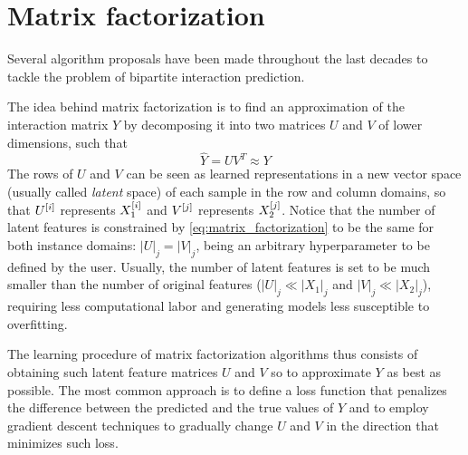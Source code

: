 \section{Matrix factorization}
\label{sec:matrix_factorization}

Several algorithm proposals have been made throughout the last decades to tackle the problem of bipartite interaction prediction. 


The idea behind matrix factorization is to find an approximation of the interaction matrix $Y$ by decomposing it into two matrices $U$ and $V$ of lower dimensions, such that %
%
\begin{equation}
    \hat Y = U V^T \approx Y
    \label{eq:matrix_factorization}
\end{equation}
%
The rows of $U$ and $V$ can be seen as learned representations in a new vector space (usually called \emph{latent} space) of each sample in the row and column domains, so that $U^{[i]}$ represents $X_1^{[i]}$ and $V^{[j]}$ represents $X_2^{[j]}$.
%
Notice that the number of latent features is constrained by \autoref{eq:matrix_factorization} to be the same for both instance domains: $|U|_j=|V|_j$, being an arbitrary hyperparameter to be defined by the user. Usually, the number of latent features is set to be much smaller than the number of original features ($|U|_j \ll |X_1|_j$ and $|V|_j \ll |X_2|_j$), requiring less computational labor and generating models less susceptible to overfitting.

The learning procedure of matrix factorization algorithms thus consists of obtaining such latent feature matrices $U$ and $V$ so to approximate $Y$ as best as possible. The most common approach is to define a loss function that penalizes the difference between the predicted and the true values of $Y$ and to employ gradient descent techniques to gradually change $U$ and $V$ in the direction that minimizes such loss.
%

